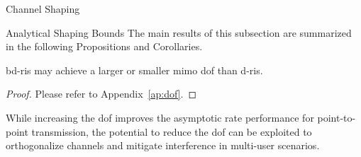 \documentclass[journal]{IEEEtran}
\begin{document}
\begin{section}{Channel Shaping}
\begin{subsection}{Analytical Shaping Bounds}
		The main results of this subsection are summarized in the following Propositions and Corollaries.
		\begin{proposition}
			\label{pp:dof}
			\gls{bd}-\gls{ris} may achieve a larger or smaller \gls{mimo} \gls{dof} than \gls{d}-\gls{ris}.
		\end{proposition}
		\begin{proof}
			Please refer to Appendix~\ref{ap:dof}.
		\end{proof}

		While increasing the \gls{dof} improves the asymptotic rate performance for point-to-point transmission, the potential to reduce the \gls{dof} can be exploited to orthogonalize channels and mitigate interference in multi-user scenarios.


\end{subsection}
\end{section}
\end{document}
